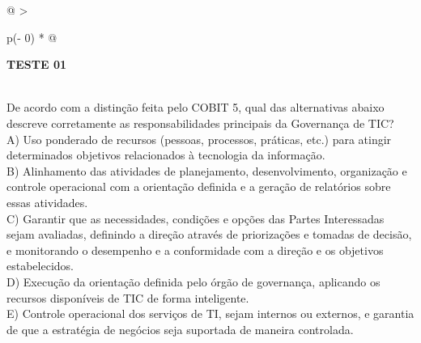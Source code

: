 \documentclass[
]{book}
\begin{document}
\begin{longtable}[]{@{}
  >{\raggedright\arraybackslash}p{(\columnwidth - 0\tabcolsep) * }@{}}
\toprule\noalign{}
\begin{minipage}[b]{\linewidth}\raggedright
\textbf{TESTE 01}
\end{minipage} \\
\midrule\noalign{}
\endhead
\bottomrule\noalign{}
\endlastfoot
De acordo com a distinção feita pelo COBIT 5, qual das alternativas abaixo descreve corretamente as responsabilidades principais da Governança de TIC? \\
A) Uso ponderado de recursos (pessoas, processos, práticas, etc.) para atingir determinados objetivos relacionados à tecnologia da informação. \\
B) Alinhamento das atividades de planejamento, desenvolvimento, organização e controle operacional com a orientação definida e a geração de relatórios sobre essas atividades. \\
C) Garantir que as necessidades, condições e opções das Partes Interessadas sejam avaliadas, definindo a direção através de priorizações e tomadas de decisão, e monitorando o desempenho e a conformidade com a direção e os objetivos estabelecidos. \\
D) Execução da orientação definida pelo órgão de governança, aplicando os recursos disponíveis de TIC de forma inteligente. \\
E) Controle operacional dos serviços de TI, sejam internos ou externos, e garantia de que a estratégia de negócios seja suportada de maneira controlada. \\
\end{longtable}
\end{document}
